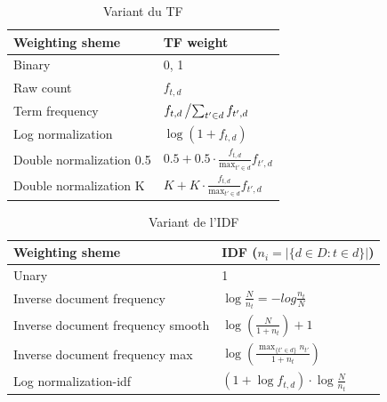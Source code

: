 \begin{table}[htbp]
    \centering
    \renewcommand{\arraystretch}{1.5} %
    \begin{tabularx}{\textwidth}{|X|X|}
        \hline
        \textbf{Weighting sheme} & \textbf{TF weight} \\
        \hline
        Binary & 0, 1 \\
        \hline
        Raw count & $f_{t,d}$ \\
        \hline
        Term frequency & $f_{t,d} \left/ \sum_{t' \in d} f_{t',d} \right.$ \\
        \hline
        Log normalization & $\log{(1 + f_{t,d})}$ \\
        \hline
        Double normalization 0.5 & $ 0.5 + 0.5 \cdot \frac{f_{t,d}}{\max_{t' \in d} } f_{t',d}$ \\
        \hline
        Double normalization K & $ K + K \cdot \frac{f_{t,d}}{\max_{t' \in d} } f_{t',d}$ \\
        \hline
    \end{tabularx}
    \caption{Variant du TF \citep{sarch-engine-vsm}}\label{tab:variant-tf}
\end{table}

\begin{table}[htbp]
    \centering
    \renewcommand{\arraystretch}{1.5} %
    \begin{tabularx}{\textwidth}{|X|X|}
        \hline
        \textbf{Weighting sheme} & \textbf{IDF ($ n_{i} = \left| \{d \in D: t \in d\} \right| $)} \\
        \hline
        Unary & 1 \\
        \hline
        Inverse document frequency & $ \log{\frac{N}{n_{t}}} = -log{\frac{n_{t}}{N}} $ \\
        \hline
        Inverse document frequency smooth & $ \log{\left( \frac{N}{1 + n_{t}} \right)} + 1 $ \\
        \hline
        Inverse document frequency max & $ \log{\left( \frac{\max_{\{ t' \in d \}} n_{t'}}{1 + n_{t}} \right)} $ \\
        \hline
        Log normalization-idf & $ (1 + \log{f_{t,d}}) \cdot \log{\frac{N}{n_{t}}} $ \\
        \hline
    \end{tabularx}
    \caption{Variant de l'IDF \citep{sarch-engine-vsm}}\label{tab:variant-idf}
\end{table}

